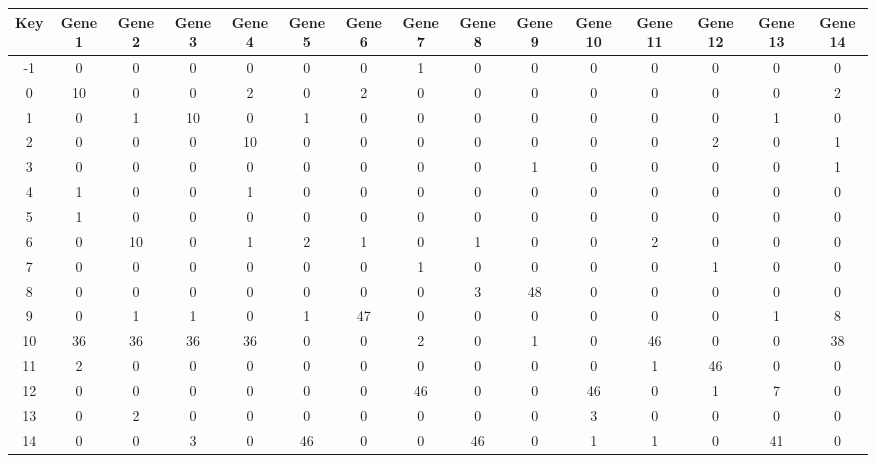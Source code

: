 \begin{tabular}{|c|c|c|c|c|c|c|c|c|c|c|c|c|c|c|}
\hline
Key & Gene 1 & Gene 2 & Gene 3 & Gene 4 & Gene 5 & Gene 6 & Gene 7 & Gene 8 & Gene 9 & Gene 10 & Gene 11 & Gene 12 & Gene 13 & Gene 14 \\
\hline
-1 & 0 & 0 & 0 & 0 & 0 & 0 & 1 & 0 & 0 & 0 & 0 & 0 & 0 & 0 \\
0 & 10 & 0 & 0 & 2 & 0 & 2 & 0 & 0 & 0 & 0 & 0 & 0 & 0 & 2 \\
1 & 0 & 1 & 10 & 0 & 1 & 0 & 0 & 0 & 0 & 0 & 0 & 0 & 1 & 0 \\
2 & 0 & 0 & 0 & 10 & 0 & 0 & 0 & 0 & 0 & 0 & 0 & 2 & 0 & 1 \\
3 & 0 & 0 & 0 & 0 & 0 & 0 & 0 & 0 & 1 & 0 & 0 & 0 & 0 & 1 \\
4 & 1 & 0 & 0 & 1 & 0 & 0 & 0 & 0 & 0 & 0 & 0 & 0 & 0 & 0 \\
5 & 1 & 0 & 0 & 0 & 0 & 0 & 0 & 0 & 0 & 0 & 0 & 0 & 0 & 0 \\
6 & 0 & 10 & 0 & 1 & 2 & 1 & 0 & 1 & 0 & 0 & 2 & 0 & 0 & 0 \\
7 & 0 & 0 & 0 & 0 & 0 & 0 & 1 & 0 & 0 & 0 & 0 & 1 & 0 & 0 \\
8 & 0 & 0 & 0 & 0 & 0 & 0 & 0 & 3 & 48 & 0 & 0 & 0 & 0 & 0 \\
9 & 0 & 1 & 1 & 0 & 1 & 47 & 0 & 0 & 0 & 0 & 0 & 0 & 1 & 8 \\
10 & 36 & 36 & 36 & 36 & 0 & 0 & 2 & 0 & 1 & 0 & 46 & 0 & 0 & 38 \\
11 & 2 & 0 & 0 & 0 & 0 & 0 & 0 & 0 & 0 & 0 & 1 & 46 & 0 & 0 \\
12 & 0 & 0 & 0 & 0 & 0 & 0 & 46 & 0 & 0 & 46 & 0 & 1 & 7 & 0 \\
13 & 0 & 2 & 0 & 0 & 0 & 0 & 0 & 0 & 0 & 3 & 0 & 0 & 0 & 0 \\
14 & 0 & 0 & 3 & 0 & 46 & 0 & 0 & 46 & 0 & 1 & 1 & 0 & 41 & 0 \\
\hline
\end{tabular}